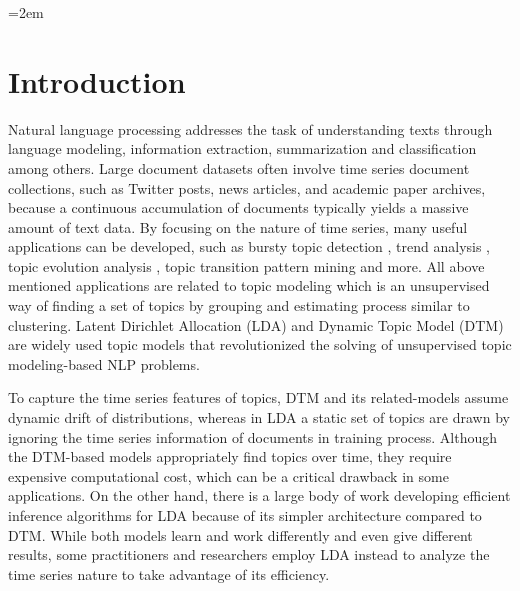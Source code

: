 \documentclass[a4paper]{report}
\begin{document}
\makecover

\addtolength{\textheight}{-5mm}
\setlength{\footskip}{15mm}	%

\justifying


\fontsize{11pt}{15pt}\selectfont

\pagebreak\setcounter{page}{1}
\pagestyle{plain}
\tableofcontents
\listoffigures

\parindent=2em	%
\pagebreak\setcounter{page}{1}
\pagestyle{plain}


\chapter{Introduction}
Natural language processing addresses the task of understanding texts through language modeling, information extraction, summarization and classification among others. 
Large document datasets often involve time series document collections, such as Twitter posts, news articles, and academic paper archives, because a continuous accumulation of documents typically yields a massive amount of text data. 
By focusing on the nature of time series, many useful applications can be developed, such as bursty topic detection \cite{koike2013time}, trend analysis \cite{kawamae2011trend,zhang2015market}, topic evolution analysis \cite{kalyanam2015context,xie2016topicsketch}, topic transition pattern mining \cite{kim2015toptrak} and more. 
All above mentioned applications are related to topic modeling which is an unsupervised way of finding a set of topics by grouping and estimating process similar to clustering.
Latent Dirichlet Allocation (LDA) \cite{blei2003latent} and Dynamic Topic Model (DTM) \cite{blei2006dynamic} are widely used topic models that revolutionized the solving of unsupervised topic modeling-based NLP problems.

To capture the time series features of topics, DTM and its related-models \cite{amoualian2016streaming,acharya2018dmdtm} assume dynamic drift of distributions, whereas in LDA a static set of topics are drawn by ignoring the time series information of documents in training process.
Although the DTM-based models appropriately find topics over time, they require expensive computational cost, which can be a critical drawback in some applications.
On the other hand, there is a large body of work developing efficient inference algorithms for LDA \cite{yut2017lda,chen2018scalable,yuan2015lightlda,chen2015warplda,yu2015scalable} because of its simpler architecture compared to DTM.
While both models learn and work differently and even give different results, some practitioners and researchers employ LDA instead to analyze the time series nature to take advantage of its efficiency.
\end{document}
